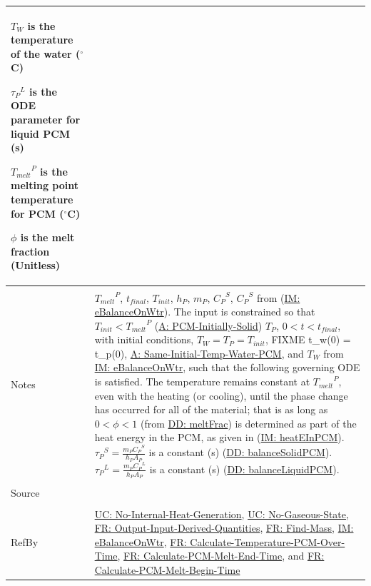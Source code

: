 \documentclass[12pt]{article}
\begin{document}
\begin{minipage}{\textwidth}
\begin{tabular}{>{\raggedright}p{}>{\raggedright\arraybackslash}p{}}
\begin{symbDescription}
              \item{${T_{W}}$ is the temperature of the water (${}^{\circ}$C)}
              \item{${{τ_{P}}^{L}}$ is the ODE parameter for liquid PCM (s)}
              \item{${{T_{melt}}^{P}}$ is the melting point temperature for PCM (${}^{\circ}$C)}
              \item{$ϕ$ is the melt fraction (Unitless)}
              \end{symbDescription}
\\ \midrule \\
Notes & ${{T_{melt}}^{P}}$, ${t_{final}}$, ${T_{init}}$, ${h_{P}}$, ${m_{P}}$, ${{C_{P}}^{S}}$, ${{C_{P}}^{S}}$ from (\hyperref[IM:eBalanceOnWtr]{IM: eBalanceOnWtr}). The input is constrained so that ${T_{init}}<{{T_{melt}}^{P}}$ (\hyperref[assumpPIS]{A: PCM-Initially-Solid}) ${T_{P}}$, $0<t<{t_{final}}$, with initial conditions, ${T_{W}}={T_{P}}={T_{init}}$, FIXME t\_w(0) = t\_p(0), \hyperref[assumpSITWP]{A: Same-Initial-Temp-Water-PCM}, and ${T_{W}}$ from \hyperref[IM:eBalanceOnWtr]{IM: eBalanceOnWtr}, such that the following governing ODE is satisfied. The temperature remains constant at ${{T_{melt}}^{P}}$, even with the heating (or cooling), until the phase change has occurred for all of the material; that is as long as $0<ϕ<1$ (from \hyperref[DD:meltFrac]{DD: meltFrac}) is determined as part of the heat energy in the PCM, as given in (\hyperref[IM:heatEInPCM]{IM: heatEInPCM}). ${{τ_{P}}^{S}}=\frac{{m_{P}} {{C_{P}}^{S}}}{{h_{P}} {A_{P}}}$ is a constant (s) (\hyperref[DD:balanceSolidPCM]{DD: balanceSolidPCM}). ${{τ_{P}}^{L}}=\frac{{m_{P}} {{C_{P}}^{L}}}{{h_{P}} {A_{P}}}$ is a constant (s) (\hyperref[DD:balanceLiquidPCM]{DD: balanceLiquidPCM}).
\\ \midrule \\
Source & \cite{koothoor2013}
\\ \midrule \\
RefBy & \hyperref[unlikeChgNIHG]{UC: No-Internal-Heat-Generation}, \hyperref[unlikeChgNGS]{UC: No-Gaseous-State}, \hyperref[outputInputDerivQuants]{FR: Output-Input-Derived-Quantities}, \hyperref[findMass]{FR: Find-Mass}, \hyperref[IM:eBalanceOnWtr]{IM: eBalanceOnWtr}, \hyperref[calcTempPCMOverTime]{FR: Calculate-Temperature-PCM-Over-Time}, \hyperref[calcPCMMeltEnd]{FR: Calculate-PCM-Melt-End-Time}, and \hyperref[calcPCMMeltBegin]{FR: Calculate-PCM-Melt-Begin-Time}
\\ \bottomrule
\end{tabular}
\end{minipage}
\end{document}
